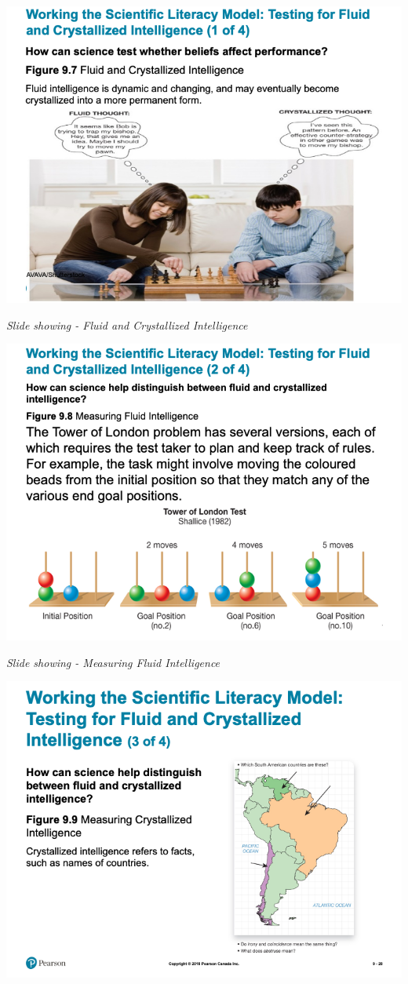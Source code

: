 \documentclass[
]{book}
\begin{document}
\begin{reflect}
\includegraphics{assets/unit_2/slide_26.png}

\emph{Slide showing - Fluid and Crystallized Intelligence}

\includegraphics{assets/unit_2/slide_27.png}

\emph{Slide showing - Measuring Fluid Intelligence}

\includegraphics{assets/unit_2/slide_28.png}


\end{reflect}
\end{document}
